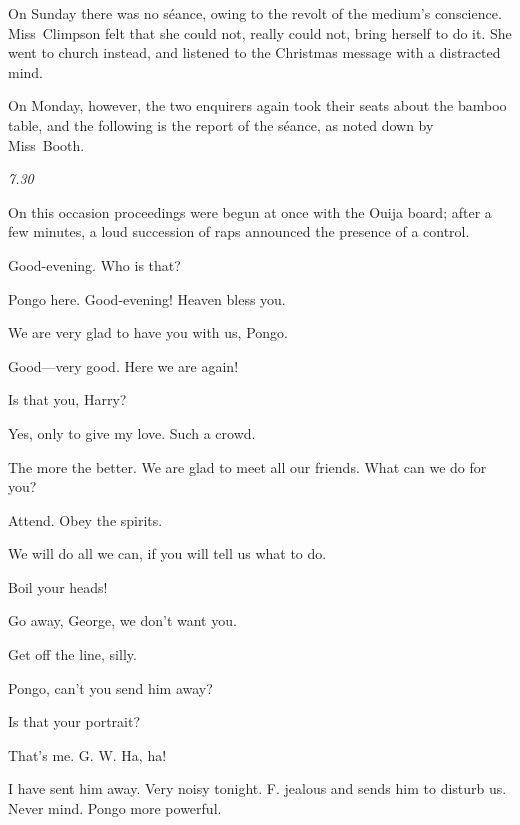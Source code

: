On Sunday there was no séance, owing to the revolt of the medium's conscience. Miss~Climpson felt that she could not, really could not, bring herself to do it. She went to church instead, and listened to the Christmas message with a distracted mind.

On Monday, however, the two enquirers again took their seats about the bamboo table, and the following is the report of the séance, as noted down by Miss~Booth.

\divider


	
\textit{7.30 }

On this occasion proceedings were begun at once with the Ouija board; after a few minutes, a loud succession of raps announced the presence of a control.

\begin{dialogue}
 Good-evening. Who is that?

 Pongo here. Good-evening! Heaven bless you.

 We are very glad to have you with us, Pongo.

 Good—very good. Here we are again!

 Is that you, Harry?

 Yes, only to give my love. Such a crowd.

 The more the better. We are glad to meet all our friends. What can we do for you?

 Attend. Obey the spirits.

 We will do all we can, if you will tell us what to do.

 Boil your heads!

 Go away, George, we don't want you.

 Get off the line, silly.

 Pongo, can't you send him away?


 Is that your portrait?

 That's me. G. W. Ha, ha!


 I have sent him away. Very noisy tonight. F. jealous and sends him to disturb us. Never mind. Pongo more powerful.


\end{dialogue}
